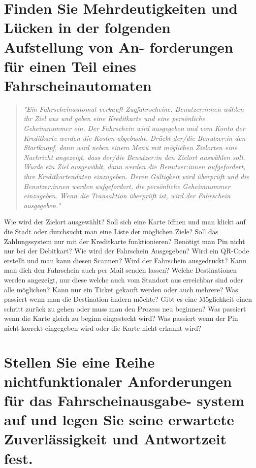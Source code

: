 \documentclass[12pt]{article}
\begin{document}
\section{Finden Sie Mehrdeutigkeiten und Lücken in der folgenden Aufstellung von An- forderungen für einen Teil
eines Fahrscheinautomaten}
\begin{quote}
\textit{"Ein Fahrscheinautomat verkauft Zugfahrscheine. Benutzer:innen wählen ihr Ziel aus und geben eine Kreditkarte und eine persönliche Geheimnummer ein. Der Fahrschein wird ausgegeben und vom Konto der
Kreditkarte werden die Kosten abgebucht. Drückt der/die Benutzer:in den Startknopf, dann wird neben einem Menü mit möglichen Zielorten eine Nachricht angezeigt, dass der/die Benutzer:in den Zielort auswählen soll. Wurde ein Ziel ausgewählt, dann werden die Benutzer:innen aufgefordert, ihre Kreditkartendaten
einzugeben. Deren Gültigkeit wird überprüft und die Benutzer:innen werden aufgefordert, die persönliche
Geheimnummer einzugeben. Wenn die Transaktion überprüft ist, wird der Fahrschein ausgegeben."}
\end{quote}
Wie wird der Zielort ausgewählt? Soll sich eine Karte öffnen und man klickt auf die Stadt oder durchsucht man eine Liste der möglichen Ziele? Soll das Zahlungssystem nur mit der Kreditkarte funktionieren? Benötigt man Pin nicht nur bei der Debitkart? Wie wird der Fahrschein Ausgegeben? Wird ein QR-Code erstellt und man kann diesen Scannen? Wird der Fahrschein ausgedruckt? Kann man dich den Fahrschein auch per Mail senden lassen? Welche Destinationen werden angezeigt, nur diese welche auch vom Standort aus erreichbar sind oder alle möglichen? Kann nur ein Ticket gekauft werden oder auch mehrere? Was passiert wenn man die Destination ändern möchte? Gibt es eine Möglichkeit einen schritt zurück zu gehen oder muss man den Prozess neu beginnen? Was passiert wenn die Karte gleich zu beginn eingesteckt wird? Was passiert wenn der Pin nicht korrekt eingegeben wird oder die Karte nicht erkannt wird?

\section{Stellen Sie eine Reihe nichtfunktionaler Anforderungen für das Fahrscheinausgabe- system auf und legen
Sie seine erwartete Zuverlässigkeit und Antwortzeit fest.}
\end{document}
